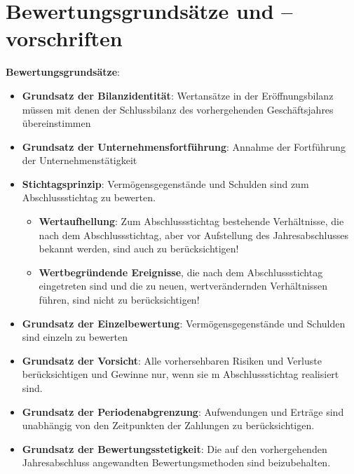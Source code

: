 \section{Bewertungsgrundsätze und –vorschriften}

\textbf{Bewertungsgrundsätze}:
\begin{itemize}
	\item \textbf{Grundsatz der Bilanzidentität}: Wertansätze in der Eröffnungsbilanz müssen mit denen der Schlussbilanz des vorhergehenden Geschäftsjahres übereinstimmen
	\item \textbf{Grundsatz der Unternehmensfortführung}: Annahme der Fortführung der Unternehmenstätigkeit
	\item \textbf{Stichtagsprinzip}: Vermögensgegenstände und Schulden sind zum Abschlussstichtag zu bewerten. 
	\begin{itemize}
		\item \textbf{Wertaufhellung}: Zum Abschlussstichtag bestehende Verhältnisse, die nach dem Abschlussstichtag, aber vor Aufstellung des Jahresabschlusses bekannt werden, sind auch zu berücksichtigen!
		\item \textbf{Wertbegründende Ereignisse}, die nach dem Abschlussstichtag eingetreten sind und die zu neuen, wertverändernden Verhältnissen führen, sind nicht zu berücksichtigen!
	\end{itemize}
	\item \textbf{Grundsatz der Einzelbewertung}: Vermögensgegenstände und Schulden sind einzeln zu
	bewerten
	\item \textbf{Grundsatz der Vorsicht}: Alle vorhersehbaren Risiken und Verluste berücksichtigen und Gewinne nur, wenn sie m Abschlussstichtag realisiert sind.
	\item \textbf{Grundsatz der Periodenabgrenzung}: Aufwendungen und Erträge sind unabhängig von den Zeitpunkten der Zahlungen zu berücksichtigen.
	\item \textbf{Grundsatz der Bewertungsstetigkeit}: Die auf den vorhergehenden Jahresabschluss angewandten Bewertungsmethoden sind beizubehalten.
\end{itemize}

